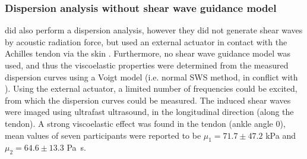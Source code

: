 \subsubsection{Dispersion analysis without shear wave guidance model}
\citeauthor{cortes_continuous_2015} did also perform a dispersion analysis, however they did not generate shear waves by acoustic radiation force, but used an external actuator in contact with the Achilles tendon via the skin \cite{cortes_continuous_2015}. Furthermore, no shear wave guidance model was used, and thus the viscoelastic properties were determined from the measured dispersion curves using a Voigt model (i.e. normal SWS method, in conflict with \cite{brum_vivo_2014, helfenstein-didier_vivo_2016}). Using the external actuator, a limited number of frequencies could be excited, from which the dispersion curves could be measured. The induced shear waves were imaged using ultrafast ultrasound, in the longitudinal direction (along the tendon). A strong viscoelastic effect was found in the tendon (ankle angle \SI{0}{\deg}), mean values of seven participants were reported to be $\mu_1 = 71.7 \pm 47.2$ \si{\kilo\pascal} and $\mu_2 = 64.6 \pm 13.3$ \si{\pascal\second}. 


%
%
%
%





